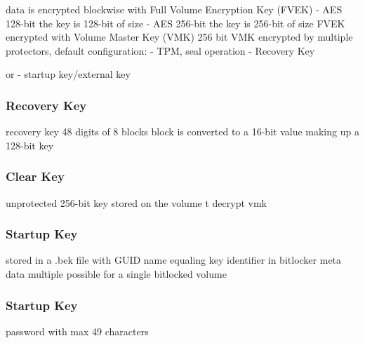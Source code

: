 data is encrypted blockwise with Full Volume Encryption Key (FVEK)
- AES 128-bit the key is 128-bit of size
- AES 256-bit the key is 256-bit of size
FVEK encrypted with Volume Master Key (VMK) 256 bit
VMK encrypted by multiple protectors, default configuration:
- TPM, seal operation
- Recovery Key

or
- startup key/external key

\subsubsection{Recovery Key}
recovery key 48 digits of 8 blocks
block is converted to a 16-bit value making up a 128-bit key

\subsubsection{Clear Key}
unprotected 256-bit key stored on the volume t decrypt vmk

\subsubsection{Startup Key}
stored in a .bek file with GUID name equaling key identifier in bitlocker meta data
multiple possible for a single bitlocked volume

\subsubsection{Startup Key}
password with max 49 characters